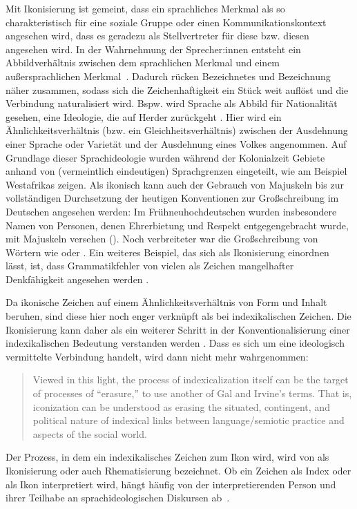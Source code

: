 Mit Ikonisierung ist gemeint, dass ein sprachliches Merkmal als so charakteristisch für eine soziale Gruppe oder einen Kommunikationskontext angesehen wird, dass es geradezu als Stellvertreter für diese bzw. diesen angesehen wird. 
In der Wahrnehmung der Sprecher:innen entsteht ein Abbildverh{\"a}ltnis zwischen dem sprachlichen Merkmal und einem au{\ss}ersprachlichen Merkmal~\citep[s.][37]{Irvine2000}. 
Dadurch rücken Bezeichnetes und Bezeichnung näher zusammen, sodass sich die Zeichenhaftigkeit ein Stück weit auflöst und die Verbindung naturalisiert wird. 
Bspw. wird Sprache als Abbild für Nationalität gesehen, eine Ideologie, die auf Herder zurückgeht \citep[s.][60]{Irvine2000}. 
Hier wird ein Ähnlichkeitsverhältnis (bzw. ein Gleichheitsverhältnis) zwischen der Ausdehnung einer Sprache oder Varietät und der Ausdehnung eines Volkes angenommen. 
Auf Grundlage dieser Sprachideologie wurden während der Kolonialzeit Gebiete anhand von (vermeintlich eindeutigen) Sprachgrenzen eingeteilt, wie \citet[48--49]{Irvine2000} am Beispiel Westafrikas zeigen. 
Als ikonisch kann auch der Gebrauch von Majuskeln bis zur vollständigen Durchsetzung der heutigen Konventionen zur Großschreibung im Deutschen angesehen werden:
Im Frühneuhochdeutschen wurden insbesondere Namen von Personen, denen Ehrerbietung und Respekt entgegengebracht wurde, mit Majuskeln versehen (\cites[s.][]{Ducker.2020b}[73]{Bergmann.1999}). 
Noch verbreiteter war die Großschreibung von Wörtern wie  oder . 
Ein weiteres Beispiel, das sich als Ikonisierung einordnen lässt, ist, dass Grammatikfehler von vielen als Zeichen mangelhafter Denkfähigkeit angesehen werden \citep[s.][11]{Eisenberg1990b}. 

Da ikonische Zeichen auf einem {\"A}hnlichkeitsverh{\"a}ltnis von Form und Inhalt beruhen, sind diese hier noch enger verkn{\"u}pft als bei indexikalischen Zeichen. 
Die Ikonisierung kann daher als ein weiterer Schritt in der Konventionalisierung einer indexikalischen Bedeutung verstanden werden \citep[s.][86]{Jaffe.2016}. 
Dass es sich um eine ideologisch vermittelte Verbindung handelt, wird dann nicht mehr wahrgenommen: \begin{quote} Viewed in this light, the process of indexicalization itself can be the target of processes of {“}erasure,{”} to use another of Gal and Irvine's terms. That is, iconization can be understood as erasing the situated, contingent, and political nature of indexical links between language/semiotic practice and aspects of the social world.~\citep[87]{Jaffe.2016}\end{quote}
Der Prozess, in dem ein indexikalisches Zeichen zum Ikon wird, wird von \citet[123]{Gal.2016} als Ikonisierung oder auch Rhematisierung bezeichnet.
Ob ein Zeichen als Index oder als Ikon interpretiert wird, hängt häufig von der interpretierenden Person und ihrer Teilhabe an sprachideologischen Diskursen ab~\citep[s.][122]{Gal.2016}. 


